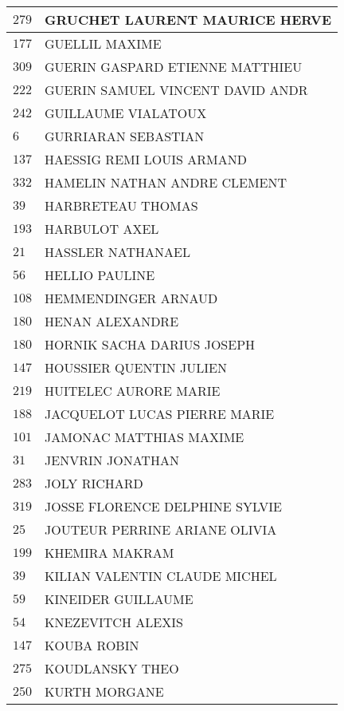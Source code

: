 \begin{xltabular}{\linewidth}{|l|X|}
    \hline
    $279$ & GRUCHET LAURENT MAURICE HERVE \\
    \hline
    $177$ & GUELLIL MAXIME \\
    \hline
    $309$ & GUERIN GASPARD ETIENNE MATTHIEU \\
    \hline
    $222$ & GUERIN SAMUEL VINCENT DAVID ANDR \\
    \hline
    $242$ & GUILLAUME VIALATOUX \\
    \hline
    $6$ & GURRIARAN SEBASTIAN \\
    \hline
    $137$ & HAESSIG REMI LOUIS ARMAND \\
    \hline
    $332$ & HAMELIN NATHAN ANDRE CLEMENT \\
    \hline
    $39$ & HARBRETEAU THOMAS \\
    \hline
    $193$ & HARBULOT AXEL \\
    \hline
    $21$ & HASSLER NATHANAEL \\
    \hline
    $56$ & HELLIO PAULINE \\
    \hline
    $108$ & HEMMENDINGER ARNAUD \\
    \hline
    $180$ & HENAN ALEXANDRE \\
    \hline
    $180$ & HORNIK SACHA DARIUS JOSEPH \\
    \hline
    $147$ & HOUSSIER QUENTIN JULIEN \\
    \hline
    $219$ & HUITELEC AURORE MARIE \\
    \hline
    $188$ & JACQUELOT LUCAS PIERRE MARIE \\
    \hline
    $101$ & JAMONAC MATTHIAS MAXIME \\
    \hline
    $31$ & JENVRIN JONATHAN \\
    \hline
    $283$ & JOLY RICHARD \\
    \hline
    $319$ & JOSSE FLORENCE DELPHINE SYLVIE \\
    \hline
    $25$ & JOUTEUR PERRINE ARIANE OLIVIA \\
    \hline
    $199$ & KHEMIRA MAKRAM \\
    \hline
    $39$ & KILIAN VALENTIN CLAUDE MICHEL \\
    \hline
    $59$ & KINEIDER GUILLAUME \\
    \hline
    $54$ & KNEZEVITCH ALEXIS \\
    \hline
    $147$ & KOUBA ROBIN \\
    \hline
    $275$ & KOUDLANSKY THEO \\
    \hline
    $250$ & KURTH MORGANE \\

\end{xltabular}
